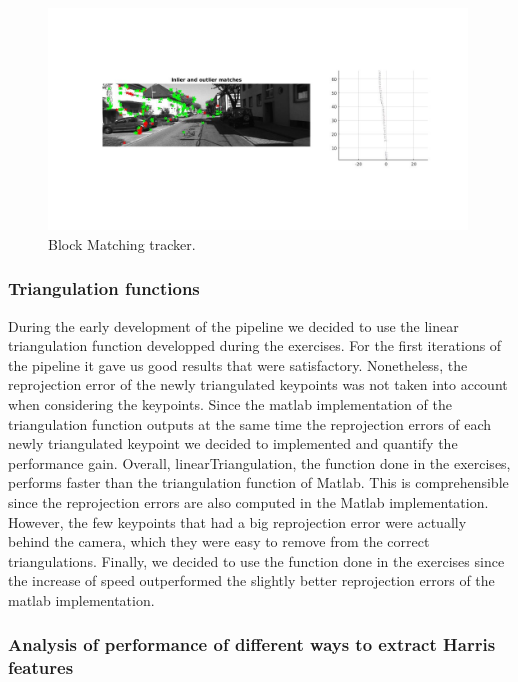 \begin{figure}
  \includegraphics[width=0.99\textwidth]{files/block_tracker.jpg}
  \caption[\label{f:block_tracker} Block Matching tracker]{Block Matching tracker.}
\end{figure}

\subsubsection{Triangulation functions}
During the early development of the pipeline we decided to use the linear triangulation function developped during the exercises.
For the first iterations of the pipeline it gave us good results that were satisfactory. Nonetheless, the reprojection error of the newly
triangulated keypoints was not taken into account when considering the keypoints.
Since the matlab implementation of the triangulation function outputs at the same time the reprojection errors of each newly triangulated
keypoint we decided to implemented and quantify the performance gain.
Overall, linearTriangulation, the function done in the exercises, performs faster than the triangulation function of Matlab. This is
comprehensible since the reprojection errors are also computed in the Matlab implementation. However, the few keypoints that had a big reprojection
error were actually behind the camera, which they were easy to remove from the correct triangulations. Finally, we decided to use the function
done in the exercises since the increase of speed outperformed the slightly better reprojection errors of the matlab implementation.

\subsubsection{Analysis of performance of different ways to extract Harris features}

